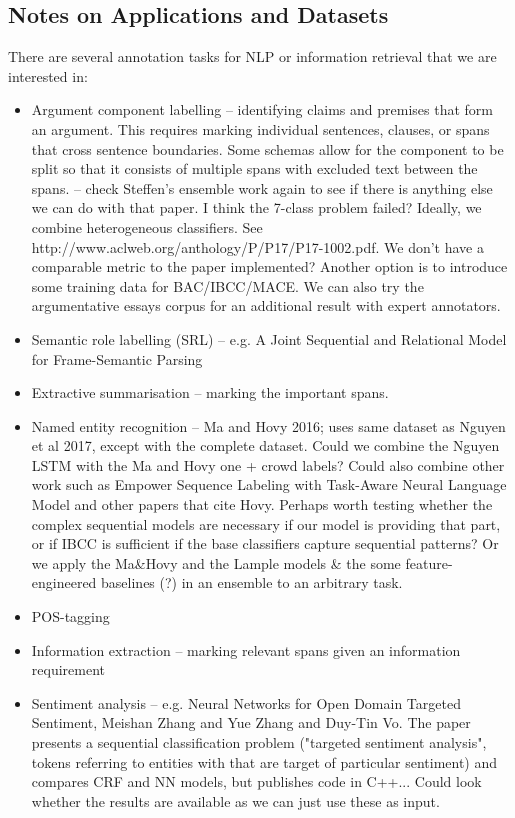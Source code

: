 \subsection{Notes on Applications and Datasets}

There are several annotation tasks for NLP or information retrieval that we are interested in:
\begin{itemize}
  \item Argument component labelling -- identifying claims and premises that form an argument. This requires marking individual sentences, clauses, or spans that cross sentence boundaries. Some schemas allow for the component to be split so that it consists of multiple spans with excluded text between the spans. -- check Steffen's ensemble work again to see if there is anything else we can do with that paper. I think the 7-class problem failed? Ideally, we combine heterogeneous classifiers. See http://www.aclweb.org/anthology/P/P17/P17-1002.pdf. We don't have a comparable metric to the paper implemented? Another option is to introduce some training data for BAC/IBCC/MACE. We can also try the argumentative essays corpus for an additional result with expert annotators.
  \item Semantic role labelling (SRL) -- e.g. A Joint Sequential and Relational Model for Frame-Semantic Parsing
  \item Extractive summarisation -- marking the important spans. 
  \item Named entity recognition -- Ma and Hovy 2016; uses same dataset as Nguyen et al 2017, except with the complete dataset. Could we combine the Nguyen LSTM with the Ma and Hovy one + crowd labels? Could also combine other work such as Empower Sequence Labeling with Task-Aware Neural Language Model and other papers that cite Hovy. Perhaps worth testing whether the complex sequential models are necessary if our model is providing that part, or if IBCC is sufficient if the base classifiers capture sequential patterns? Or we apply the Ma&Hovy and the Lample models & the some feature-engineered baselines (?) in an ensemble to an arbitrary task.
  \item POS-tagging
  \item Information extraction -- marking relevant spans given an information requirement
  \item Sentiment analysis -- e.g. Neural Networks for Open Domain Targeted Sentiment, Meishan Zhang and Yue Zhang and Duy-Tin Vo. The paper presents a sequential classification problem ("targeted sentiment analysis", tokens referring to entities with that are target of particular sentiment) and compares CRF and NN models, but publishes code in C++... Could look whether the results are available as we can just use these as input.

\end{itemize}
